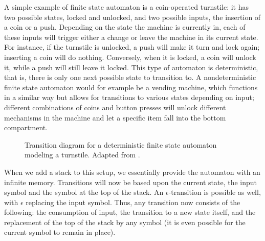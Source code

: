 A simple example of finite state automaton is a coin-operated turnstile: it has
two possible states, locked and unlocked, and two possible inputs, the
insertion of a coin or a push. Depending on the state the machine is currently
in, each of these inputs will trigger either a change or leave the machine in
its current state. For instance, if the turnstile is unlocked, a push will make
it turn and lock again; inserting a coin will do nothing.  Conversely, when it
is locked, a coin will unlock it, while a push will still leave it locked. This
type of automaton is deterministic, that is, there is only one next possible
state to transition to. A nondeterministic finite state automaton would for
example be a vending machine, which functions in a similar way but allows for
transitions to various states depending on input; different combinations of
coins and button presses will unlock different mechanisms in the machine and
let a specific item fall into the bottom compartment.

\begin{figure}
\caption{Transition diagram for a deterministic finite state automaton modeling a turnstile. Adapted from \citet[762]{koshy2004}.} \label{fig:turnstile}
\end{figure}

When we add a stack to this setup, we essentially provide the automaton with an
infinite memory. Transitions will now be based upon the current state, the
input symbol and the symbol at the top of the stack. An $\epsilon$-transition
is possible as well, with $\epsilon$ replacing the input symbol. Thus, any
transition now consists of the following: the consumption of input, the
transition to a new state itself, and the replacement of the top of the stack
by any symbol (it is even possible for the current symbol to remain in place).

